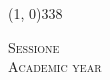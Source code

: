 \documentclass[../thesis.tex]{subfiles}
\begin{document}
\begin{titlepage}
\begin{center}
            \vfill

            \line(1, 0){338} \\
            
            \begin{normalsize}
                \textsc{Sessione \mySession}\\
                \textsc{Academic year \myAY}
            \end{normalsize}

        \end{center}
    \end{titlepage}
\end{document}
